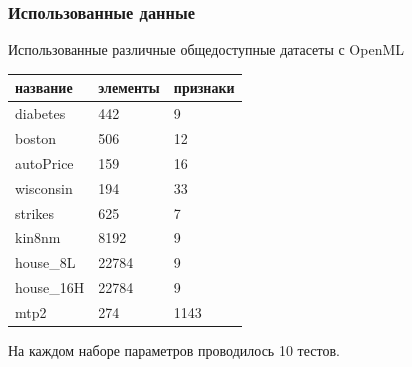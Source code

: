 \documentclass{beamer}
\begin{document}
\begin{frame} \frametitle{Использованные данные}
    Использованные различные общедоступные датасеты с OpenML

    \vfill
    \begin{center}
        \begin{tabular}{|l|l|l|}

        \hline

        название        & элементы  & признаки \\

        \hline

        diabetes        & 442    & 9     \\
        boston          & 506    & 12    \\
        autoPrice       & 159    & 16    \\
        wisconsin       & 194    & 33    \\
        strikes         & 625    & 7     \\
        kin8nm          & 8192   & 9     \\
        house\_8L       & 22784  & 9     \\
        house\_16H      & 22784  & 9     \\
        mtp2            & 274    & 1143  \\

        \hline

    \end{tabular}

    \vfill
    На каждом наборе параметров проводилось 10 тестов.
    \end{center}
\end{frame}
\end{document}
